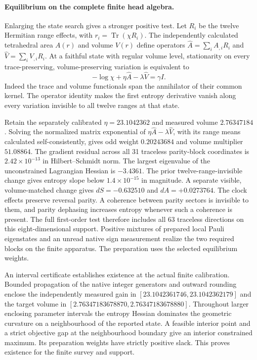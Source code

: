 \documentclass[11pt]{article}
\begin{document}
\paragraph{Equilibrium on the complete finite head algebra.}
Enlarging the state search gives a stronger positive test. Let $R_i$
be the twelve Hermitian range effects, with $r_i=\operatorname{Tr}
(\chi R_i)$. The independently calculated tetrahedral area $A(r)$
and volume $V(r)$ define operators $\widehat A=\sum_i A_{,i} R_i$ and
$\widehat V=\sum_i V_{,i}R_i$. At a faithful state with regular
volume level, stationarity on every trace-preserving, volume-preserving
variation is equivalent to
\[
 -\log\chi+\eta\widehat A-\lambda\widehat V=\gamma I.
\]
Indeed the trace and volume functionals span the annihilator of their
common kernel. The operator identity makes the first entropy derivative vanish along
every variation invisible to all twelve ranges at that state.

Retain the separately calibrated $\eta=23.1042362$ and measured
volume $2.76347184$. Solving the normalized matrix exponential
of $\eta\widehat A-\lambda\widehat V$, with its range means
calculated self-consistently, gives odd weight $0.20243684$
and volume multiplier $51.08864$. The gradient residual across
all 31 traceless parity-block coordinates is
$2.42\times10^{-13}$ in Hilbert--Schmidt norm. The largest
eigenvalue of the unconstrained Lagrangian Hessian is $-3.4361$.
The prior twelve-range-invisible change gives entropy slope below
$1.4\times10^{-15}$ in magnitude. A separate visible, volume-matched
change gives $dS=-0.632510$ and $dA=+0.0273764$.
The clock effects preserve reversal parity. A coherence between
parity sectors is invisible to them, and parity dephasing increases
entropy whenever such a coherence is present. The full first-order
test therefore includes all 63 traceless directions on this
eight-dimensional support. Positive mixtures of prepared local
Pauli eigenstates and an unread native sign measurement realize the
two required blocks on the finite apparatus. The preparation uses the
selected equilibrium weights.

An interval certificate establishes existence at the actual finite
calibration. Bounded propagation of the native integer generators
and outward rounding enclose the independently measured gain in
$[23.1042361746,23.1042362179]$ and the target volume in
$[2.76347183678870,2.76347183678880]$. Throughout larger enclosing
parameter intervals the entropy Hessian dominates the geometric
curvature on a neighbourhood of the reported state. A feasible
interior point and a strict objective gap at the neighbourhood
boundary give an interior constrained maximum. Its preparation
weights have strictly positive slack. This proves existence for
the finite survey and support.
\end{document}

